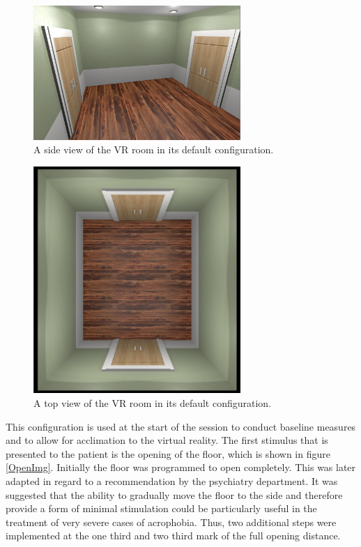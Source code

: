 \begin{figure}[H]
\centering
\includegraphics[width=0.7\textwidth]{images/RoomDefault.png}
\caption{A side view of the VR room in its default configuration.}
\label{VRdefaultImg}
\end{figure}

\begin{figure}[H]
\centering
\includegraphics[width=0.7\textwidth]{images/RoomDefaultTop.png}
\caption{A top view of the VR room in its default configuration.}
\label{VRdefaultTopImg}
\end{figure}

This configuration is used at the start of the session to conduct baseline measures and to allow for acclimation to the virtual reality. The first stimulus that is presented to the patient is the opening of the floor, which is shown in figure \ref{OpenImg}. Initially the floor was programmed to open completely. This was later adapted in regard to a recommendation by the psychiatry department. It was suggested that the ability to gradually move the floor to the side and therefore provide a form of minimal stimulation could be particularly useful in the treatment of very severe cases of acrophobia. Thus, two additional steps were implemented at the one third and two third mark of the full opening distance.

